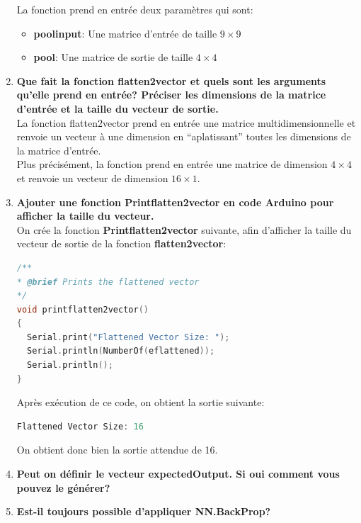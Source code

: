 \documentclass[a4paper, 12pt, openany]{book}
\begin{document}
\begin{enumerate}
{    La fonction prend en entrée deux paramètres qui sont:
    \begin{itemize}
      \item \textbf{poolinput}: Une matrice d'entrée de taille $9 \times 9$
      \item \textbf{pool}: Une matrice de sortie de taille $4 \times 4$ \\
    \end{itemize}
  } \newpage
  \item {
    \textbf{Que fait la fonction flatten2vector et quels sont les arguments qu'elle prend en entrée? Préciser les dimensions de 
    la matrice d'entrée et la taille du vecteur de sortie.} \vspace{0.2cm}\\ 
    La fonction flatten2vector prend en entrée une matrice multidimensionnelle et renvoie un vecteur à une dimension en ``aplatissant'' toutes les dimensions de la matrice d'entrée. \\
    Plus précisément, la fonction prend en entrée une matrice de dimension $4\times 4$ et renvoie un vecteur de dimension $16\times 1$.
  } 
  \item {
    \textbf{Ajouter une fonction Printflatten2vector en code Arduino pour afficher la taille du vecteur.} \vspace{0.2cm} \\ 
    On crée la fonction \textbf{Printflatten2vector} suivante, afin d'afficher la taille du vecteur de sortie de la fonction \textbf{flatten2vector}:
    \begin{lstlisting}[language=C]
/**
* @brief Prints the flattened vector
*/
void printflatten2vector()
{
  Serial.print("Flattened Vector Size: ");
  Serial.println(NumberOf(eflattened));
  Serial.println();
}
    \end{lstlisting}
    Après exécution de ce code, on obtient la sortie suivante:
    \begin{lstlisting}[language=C]
Flattened Vector Size: 16
    \end{lstlisting}
    On obtient donc bien la sortie attendue de 16.
  } 
  \item {
    \textbf{Peut on définir le vecteur expectedOutput. Si oui comment vous pouvez le générer?} \vspace{0.2cm} \\
  } 
  \item {
    \textbf{Est-il toujours possible d'appliquer NN.BackProp?} \vspace{0.2cm} \\
}
\end{enumerate}
\end{document}
